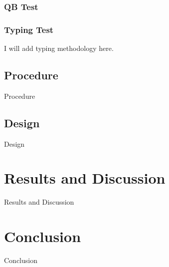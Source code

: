 \documentclass[manuscript, screen]{acmart} %
\begin{document}
\subsubsection{QB Test}
\subsubsection{Typing Test}

I will add typing methodology here.

\subsection[short]{Procedure}
Procedure

\subsection[short]{Design}
Design

\section{Results and Discussion}
Results and Discussion

\section{Conclusion}
Conclusion




\end{document}
